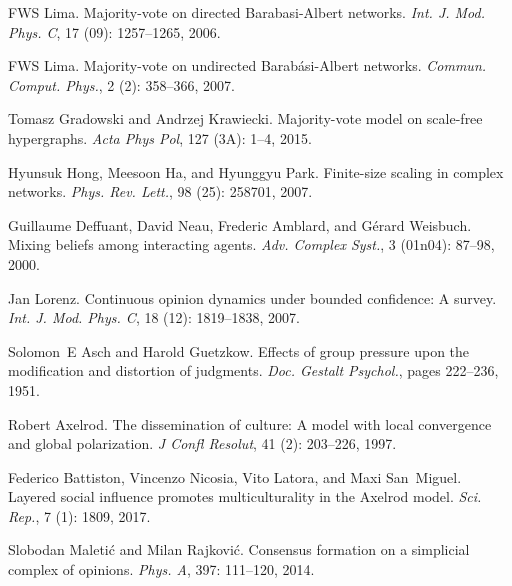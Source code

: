 FWS Lima.
\newblock Majority-vote on directed Barabasi-Albert networks.
\newblock \emph{Int. J. Mod. Phys. C}, 17 (09): 1257--1265,
2006.

FWS Lima.
\newblock Majority-vote on undirected {{Barab{\'a}si}}-{{Albert}} networks.
\newblock \emph{Commun. Comput. Phys.}, 2 (2): 358--366,
2007.

Tomasz Gradowski and Andrzej Krawiecki.
\newblock Majority-vote model on scale-free hypergraphs.
\newblock \emph{Acta Phys Pol}, 127 (3A): 1--4, 2015.

Hyunsuk Hong, Meesoon Ha, and Hyunggyu Park.
\newblock Finite-size scaling in complex networks.
\newblock \emph{Phys. Rev. Lett.}, 98 (25): 258701, 2007.

Guillaume Deffuant, David Neau, Frederic Amblard, and G{\'e}rard Weisbuch.
\newblock Mixing beliefs among interacting agents.
\newblock \emph{Adv. Complex Syst.}, 3 (01n04): 87--98, 2000.

Jan Lorenz.
\newblock Continuous opinion dynamics under bounded confidence: {{A}} survey.
\newblock \emph{Int. J. Mod. Phys. C}, 18 (12): 1819--1838,
2007.

Solomon~E Asch and Harold Guetzkow.
\newblock Effects of group pressure upon the modification and distortion of
judgments.
\newblock \emph{Doc. Gestalt Psychol.}, pages 222--236, 1951.

Robert Axelrod.
\newblock The dissemination of culture: {{A}} model with local convergence and
global polarization.
\newblock \emph{J Confl Resolut}, 41 (2): 203--226, 1997.

Federico Battiston, Vincenzo Nicosia, Vito Latora, and Maxi San~Miguel.
\newblock Layered social influence promotes multiculturality in the {{Axelrod}}
model.
\newblock \emph{Sci. Rep.}, 7 (1): 1809, 2017{}.

Slobodan Maleti{\'c} and Milan Rajkovi{\'c}.
\newblock Consensus formation on a simplicial complex of opinions.
\newblock \emph{Phys. A}, 397: 111--120, 2014.

